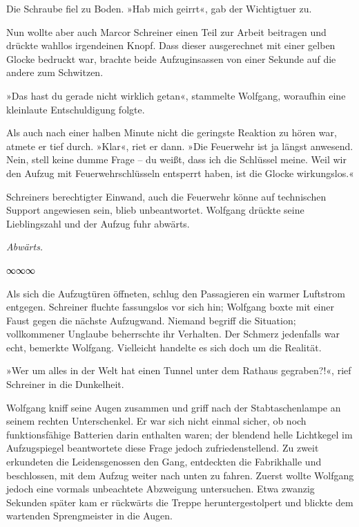 Die Schraube fiel zu Boden. »Hab mich geirrt«, gab der Wichtigtuer zu.

Nun wollte aber auch Marcor Schreiner einen Teil zur Arbeit beitragen und drückte wahllos irgendeinen Knopf. Dass dieser ausgerechnet mit einer gelben Glocke bedruckt war, brachte beide Aufzuginsassen von einer Sekunde auf die andere zum Schwitzen.

»Das hast du gerade nicht wirklich getan«, stammelte Wolfgang, woraufhin eine kleinlaute Entschuldigung folgte.

Als auch nach einer halben Minute nicht die geringste Reaktion zu hören war, atmete er tief durch. »Klar«, riet er dann. »Die Feuerwehr ist ja längst anwesend. Nein, stell keine dumme Frage – du weißt, dass ich die Schlüssel meine. Weil wir den Aufzug mit Feuerwehrschlüsseln entsperrt haben, ist die Glocke wirkungslos.«

Schreiners berechtigter Einwand, auch die Feuerwehr könne auf technischen Support angewiesen sein, blieb unbeantwortet. Wolfgang drückte seine Lieblingszahl und der Aufzug fuhr abwärts.

\emph{Abwärts.}

\begin{center}
∞∞∞
\end{center}


Als sich die Aufzugtüren öffneten, schlug den Passagieren ein warmer Luftstrom entgegen. Schreiner fluchte fassungslos vor sich hin; Wolfgang boxte mit einer Faust gegen die nächste Aufzugwand. Niemand begriff die Situation; vollkommener Unglaube beherrschte ihr Verhalten. Der Schmerz jedenfalls war echt, bemerkte Wolfgang. Vielleicht handelte es sich doch um die Realität.

»Wer um alles in der Welt hat einen Tunnel unter dem Rathaus gegraben?!«, rief Schreiner in die Dunkelheit.

Wolfgang kniff seine Augen zusammen und griff nach der Stabtaschenlampe an seinem rechten Unterschenkel. Er war sich nicht einmal sicher, ob noch funktionsfähige Batterien darin enthalten waren; der blendend helle Lichtkegel im Aufzugspiegel beantwortete diese Frage jedoch zufriedenstellend. Zu zweit erkundeten die Leidensgenossen den Gang, entdeckten die Fabrikhalle und beschlossen, mit dem Aufzug weiter nach unten zu fahren. Zuerst wollte Wolfgang jedoch eine vormals unbeachtete Abzweigung untersuchen. Etwa zwanzig Sekunden später kam er rückwärts die Treppe heruntergestolpert und blickte dem wartenden Sprengmeister in die Augen.

